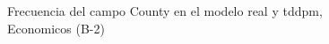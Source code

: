 \begin{figure}[H]
    \centering
    
    \caption{Frecuencia del campo County en el modelo real y tddpm, Economicos (B-2)}
    \label{frecuency-County-tddpm_mlp}
\end{figure}